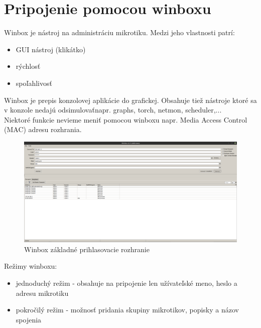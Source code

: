 \section{Pripojenie pomocou winboxu}
Winbox\cite{winbox} je nástroj na administráciu mikrotiku. Medzi jeho vlastnosti patrí:\begin{itemize}
\item GUI nástroj (klikátko)
\item rýchlosť
\item spoľahlivosť 
\end{itemize} 
Winbox je prepis konzolovej aplikácie do grafickej. Obsahuje tiež nástroje ktoré sa v konzole nedajú odsimulovaťnapr. graphs, torch, netmon, scheduler,...\\
Niektoré funkcie nevieme meniť pomocou winboxu napr. Media Access Control (MAC) adresu rozhrania. 
\begin{figure}[H]
\centering
\includegraphics[scale=0.2]{../text/winbox.png}
\caption{Winbox základné prihlasovacie rozhranie}
\label{fig:winbox}
\end{figure} 
Režimy winboxu:\begin{itemize}
\item jednoduchý režim - obsahuje na pripojenie len užívateľské meno, heslo a adresu mikrotiku
\item pokročilý režim - možnosť pridania skupiny mikrotikov, popisky a názov spojenia
\end{itemize}
